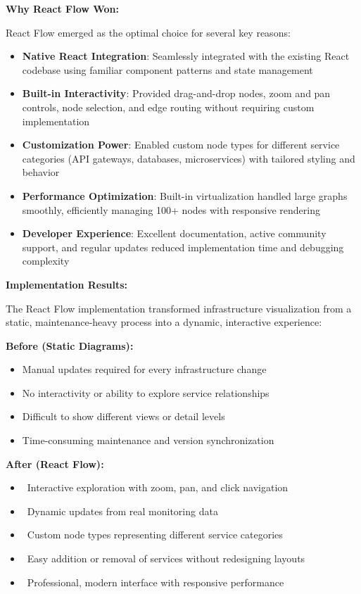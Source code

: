 \textbf{Why React Flow Won:}

React Flow emerged as the optimal choice for several key reasons:

\begin{itemize}
    \item \textbf{Native React Integration}: Seamlessly integrated with the existing React codebase using familiar component patterns and state management
    \item \textbf{Built-in Interactivity}: Provided drag-and-drop nodes, zoom and pan controls, node selection, and edge routing without requiring custom implementation
    \item \textbf{Customization Power}: Enabled custom node types for different service categories (API gateways, databases, microservices) with tailored styling and behavior
    \item \textbf{Performance Optimization}: Built-in virtualization handled large graphs smoothly, efficiently managing 100+ nodes with responsive rendering
    \item \textbf{Developer Experience}: Excellent documentation, active community support, and regular updates reduced implementation time and debugging complexity
\end{itemize}

\textbf{Implementation Results:}

The React Flow implementation transformed infrastructure visualization from a static, maintenance-heavy process into a dynamic, interactive experience:

\textbf{Before (Static Diagrams):}
\begin{itemize}
    \item Manual updates required for every infrastructure change
    \item No interactivity or ability to explore service relationships
    \item Difficult to show different views or detail levels
    \item Time-consuming maintenance and version synchronization
\end{itemize}

\textbf{After (React Flow):}
\begin{itemize}
    \item \checkmark\ Interactive exploration with zoom, pan, and click navigation
    \item \checkmark\ Dynamic updates from real monitoring data
    \item \checkmark\ Custom node types representing different service categories
    \item \checkmark\ Easy addition or removal of services without redesigning layouts
    \item \checkmark\ Professional, modern interface with responsive performance
\end{itemize}


